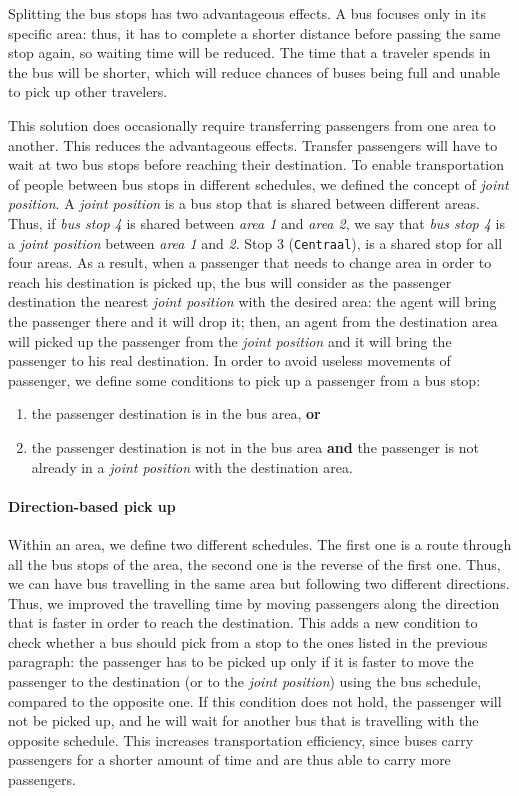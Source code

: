 \documentclass[a4paper]{article}
\begin{document}
Splitting the bus stops has two advantageous effects. A bus focuses only in its specific area: thus, it has to complete a shorter distance before passing the same stop again, so waiting time will be reduced. The time that a traveler spends in the bus will be shorter, which will reduce chances of buses being full and unable to pick up other travelers.

This solution does occasionally require transferring passengers from one area to another. This reduces the advantageous effects. Transfer passengers will have to wait at two bus stops before reaching their destination. To enable transportation of people between bus stops in different schedules, we defined the concept of \textit{joint position}. A \textit{joint position} is a bus stop that is shared between different areas. Thus, if \textit{bus stop 4} is shared between \textit{area 1} and \textit{area 2}, we say that \textit{bus stop 4} is a \textit{joint position}  between \textit{area 1} and \textit{2}. Stop 3 (\texttt{Centraal}), is a shared stop for all four areas. As a result, when a passenger that needs to change area in order to reach his destination is picked up, the bus will consider as the passenger destination the nearest \textit{joint position} with the desired area: the agent will bring the passenger there and it will drop it; then, an agent from the destination area will picked up the passenger from the \textit{joint position} and it will bring the passenger to his real destination. In order to avoid useless movements of passenger, we define some conditions to pick up a passenger from a bus stop:

\begin{enumerate}
\item the passenger destination is in the bus area, \textbf{or}
\item the passenger destination is not in the bus area \textbf{and} the passenger is not already in a \textit{joint position} with the destination area.
\end{enumerate}


\paragraph{Direction-based pick up}
Within an area, we define two different schedules. The first one is a route through all the bus stops of the area, the second one is the reverse of the first one. Thus, we can have bus travelling in the same area but following two different directions. Thus, we improved the travelling time by moving passengers along the direction that is faster in order to reach the destination. This adds a new condition to check whether a bus should pick from a stop to the ones listed in the previous paragraph: the passenger has to be picked up only if it is faster to move the passenger to the destination (or to the \textit{joint position}) using the bus schedule, compared to the opposite one. If this condition does not hold, the passenger will not be picked up, and he will wait for another bus that is travelling with the opposite schedule. This increases transportation efficiency, since buses carry passengers for a shorter amount of time and are thus able to carry more passengers. 
\end{document}
